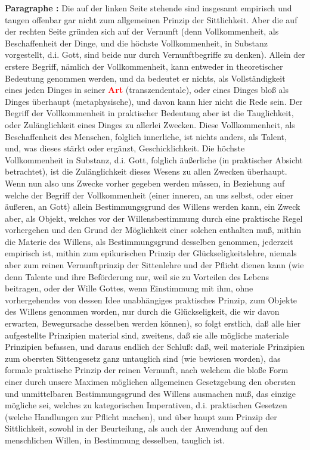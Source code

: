 \documentclass[a4paper,12pt,twoside]{book}
\newcommand{\match}[1]{\textcolor{red}{\textbf{#1}}}
\begin{document}
	\noindent\textbf{Paragraphe : }Die auf der linken Seite stehende sind insgesamt empirisch und taugen offenbar gar nicht zum allgemeinen Prinzip der Sittlichkeit. Aber die auf der rechten Seite gründen sich auf der Vernunft (denn Vollkommenheit, als Beschaffenheit der Dinge, und die höchste Vollkommenheit, in Substanz vorgestellt, d.i. Gott, sind beide nur durch Vernunftbegriffe zu denken). Allein der erstere Begriff, nämlich der Vollkommenheit, kann entweder in theoretischer Bedeutung genommen werden, und da bedeutet er nichts, als Vollständigkeit eines jeden Dinges in seiner \match{Art} (transzendentale), oder eines Dinges bloß als Dinges überhaupt (metaphysische), und davon kann hier nicht die Rede sein. Der Begriff der Vollkommenheit in praktischer Bedeutung aber ist die Tauglichkeit, oder Zulänglichkeit eines Dinges zu allerlei Zwecken. Diese Vollkommenheit, als Beschaffenheit des Menschen, folglich innerliche, ist nichts anders, als Talent, und, was dieses stärkt oder ergänzt, Geschicklichkeit. Die höchste Vollkommenheit in Substanz, d.i. Gott, folglich äußerliche (in praktischer Absicht betrachtet), ist die Zulänglichkeit dieses Wesens zu allen Zwecken überhaupt. Wenn nun also uns Zwecke vorher gegeben werden müssen, in Beziehung auf welche der Begriff der Vollkommenheit (einer inneren, an uns selbst, oder einer äußeren, an Gott) allein Bestimmungsgrund des Willens werden kann, ein Zweck aber, als Objekt, welches vor der Willensbestimmung durch eine praktische Regel vorhergehen und den Grund der Möglichkeit einer solchen enthalten muß, mithin die Materie des Willens, als Bestimmungsgrund desselben genommen, jederzeit empirisch ist, mithin zum epikurischen Prinzip der Glückseligkeitslehre, niemals aber zum reinen Vernunftprinzip der Sittenlehre und der Pflicht dienen kann (wie denn Talente und ihre Beförderung nur, weil sie zu Vorteilen des Lebens beitragen, oder der Wille Gottes, wenn Einstimmung mit ihm, ohne vorhergehendes von dessen Idee unabhängiges praktisches Prinzip, zum Objekte des Willens genommen worden, nur durch die Glückseligkeit, die wir davon erwarten, Bewegursache desselben werden können), so folgt erstlich, daß alle hier aufgestellte Prinzipien material sind, zweitens, daß sie alle mögliche materiale Prinzipien befassen, und daraus endlich der Schluß: daß, weil materiale Prinzipien zum obersten Sittengesetz ganz untauglich sind (wie bewiesen worden), das formale praktische Prinzip der reinen Vernunft, nach welchem die bloße Form einer durch  unsere Maximen möglichen allgemeinen Gesetzgebung den obersten und unmittelbaren Bestimmungsgrund des Willens ausmachen muß, das einzige mögliche sei, welches zu kategorischen Imperativen, d.i. praktischen Gesetzen (welche Handlungen zur Pflicht machen), und über haupt zum Prinzip der Sittlichkeit, sowohl in der Beurteilung, als auch der Anwendung auf den menschlichen Willen, in Bestimmung desselben, tauglich ist. 
	
\end{document}
